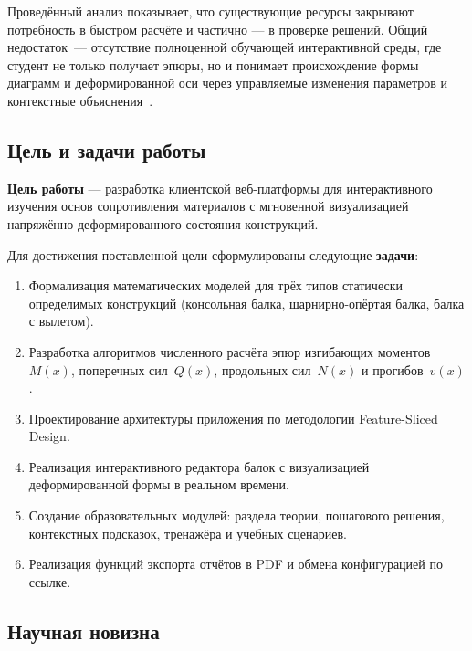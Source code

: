 Проведённый анализ показывает, что существующие ресурсы закрывают потребность в быстром расчёте и частично --- в проверке решений. Общий недостаток~--- отсутствие полноценной обучающей интерактивной среды, где студент не только получает эпюры, но и понимает происхождение формы диаграмм и деформированной оси через управляемые изменения параметров и контекстные объяснения~\cite{philpot2003, panagiotopoulos2016}.

\subsection*{Цель и задачи работы}

\textbf{Цель работы} --- разработка клиентской веб-платформы для интерактивного изучения основ сопротивления материалов с мгновенной визуализацией напряжённо-деформированного состояния конструкций.

Для достижения поставленной цели сформулированы следующие \textbf{задачи}:
\begin{enumerate}
  \item Формализация математических моделей для трёх типов статически определимых конструкций (консольная балка, шарнирно-опёртая балка, балка с вылетом).
  \item Разработка алгоритмов численного расчёта эпюр изгибающих моментов~$M(x)$, поперечных сил~$Q(x)$, продольных сил~$N(x)$ и прогибов~$v(x)$.
  \item Проектирование архитектуры приложения по методологии Feature-Sliced Design.
  \item Реализация интерактивного редактора балок с визуализацией деформированной формы в реальном времени.
  \item Создание образовательных модулей: раздела теории, пошагового решения, контекстных подсказок, тренажёра и учебных сценариев.
  \item Реализация функций экспорта отчётов в PDF и обмена конфигурацией по ссылке.
\end{enumerate}

\subsection*{Научная новизна}

